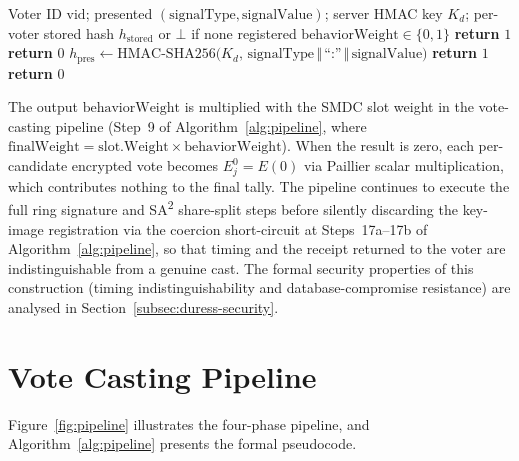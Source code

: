 \begin{algorithm}[H]
\caption{Behavioural Duress Detection (mirrors \texttt{internal/biometric/duress.go})}
\label{alg:duress}
\begin{algorithmic}[1]
\Require Voter ID $\text{vid}$; presented $(\text{signalType}, \text{signalValue})$; server HMAC key $K_d$; per-voter stored hash $h_{\text{stored}}$ or $\bot$ if none registered
\Ensure $\text{behaviorWeight} \in \{0, 1\}$
    \State \textbf{return} $1$ 
\EndIf
{}
    \State \textbf{return} $0$
\EndIf
\State $h_{\text{pres}} \gets \text{HMAC-SHA256}\bigl(K_d,\, \text{signalType}\,\Vert\,\text{``:''}\,\Vert\,\text{signalValue}\bigr)$
    \State \textbf{return} $1$ 
\Else
    \State \textbf{return} $0$ 
\EndIf
\end{algorithmic}
\end{algorithm}

The output $\text{behaviorWeight}$ is multiplied with the SMDC slot weight in the vote-casting pipeline (Step~9 of Algorithm~\ref{alg:pipeline}, where $\text{finalWeight} = \text{slot.Weight} \times \text{behaviorWeight}$). When the result is zero, each per-candidate encrypted vote becomes $E_j^{0} = E(0)$ via Paillier scalar multiplication, which contributes nothing to the final tally. The pipeline continues to execute the full ring signature and SA\textsuperscript{2} share-split steps before silently discarding the key-image registration via the coercion short-circuit at Steps~17a--17b of Algorithm~\ref{alg:pipeline}, so that timing and the receipt returned to the voter are indistinguishable from a genuine cast. The formal security properties of this construction (timing indistinguishability and database-compromise resistance) are analysed in Section~\ref{subsec:duress-security}.

\section{Vote Casting Pipeline}
\label{sec:pipeline}

Figure~\ref{fig:pipeline} illustrates the four-phase pipeline, and Algorithm~\ref{alg:pipeline} presents the formal pseudocode.

